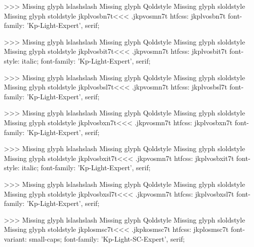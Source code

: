 >>>
Missing glyph	lslashslash
Missing glyph	Qoldstyle
Missing glyph	sloldstyle
Missing glyph	stoldstyle
\<jkplvosbn7t\><<<
.jkpvosmn7t
htfcss:  jkplvosbn7t  font-family: 'Kp-Light-Expert', serif;

>>>
Missing glyph	lslashslash
Missing glyph	Qoldstyle
Missing glyph	sloldstyle
Missing glyph	stoldstyle
\<jkplvosbit7t\><<<
.jkpvosmn7t
htfcss:  jkplvosbit7t  font-style: italic; font-family: 'Kp-Light-Expert', serif;

>>>
Missing glyph	lslashslash
Missing glyph	Qoldstyle
Missing glyph	sloldstyle
Missing glyph	stoldstyle
\<jkplvosbsl7t\><<<
.jkpvosmn7t
htfcss:  jkplvosbsl7t  font-family: 'Kp-Light-Expert', serif;

>>>
Missing glyph	lslashslash
Missing glyph	Qoldstyle
Missing glyph	sloldstyle
Missing glyph	stoldstyle
\<jkplvosbxn7t\><<<
.jkpvosmn7t
htfcss:  jkplvosbxn7t  font-family: 'Kp-Light-Expert', serif;

>>>
Missing glyph	lslashslash
Missing glyph	Qoldstyle
Missing glyph	sloldstyle
Missing glyph	stoldstyle
\<jkplvosbxit7t\><<<
.jkpvosmn7t
htfcss:  jkplvosbxit7t  font-style: italic; font-family: 'Kp-Light-Expert', serif;

>>>
Missing glyph	lslashslash
Missing glyph	Qoldstyle
Missing glyph	sloldstyle
Missing glyph	stoldstyle
\<jkplvosbxsl7t\><<<
.jkpvosmn7t
htfcss:  jkplvosbxsl7t  font-family: 'Kp-Light-Expert', serif;

>>>
Missing glyph	lslashslash
Missing glyph	Qoldstyle
Missing glyph	sloldstyle
Missing glyph	stoldstyle
\<jkplosmsc7t\><<<
.jkpkosmsc7t
htfcss:  jkplosmsc7t  font-variant: small-caps; font-family: 'Kp-Light-SC-Expert', serif;

